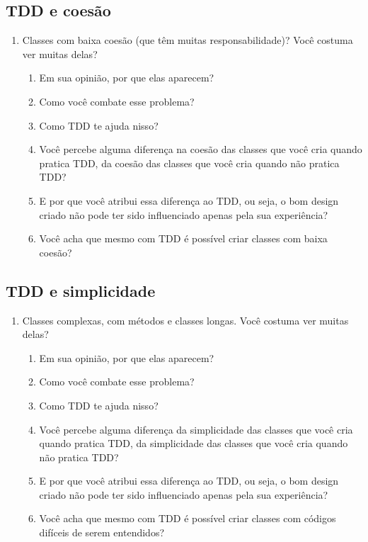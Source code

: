 \subsection{TDD e coesão}
\label{entrevista:coesao}

\begin{enumerate}
	\item{Classes com baixa coesão (que têm muitas responsabilidade)? Você
	costuma ver muitas delas?}
		\begin{enumerate}
			\item Em sua opinião, por que elas aparecem?

			\item Como você combate esse problema?

			\item Como TDD te ajuda nisso?
			
			\item Você percebe alguma diferença na coesão das classes que você cria quando
			pratica TDD, da coesão das classes que você cria quando não pratica TDD?
			
			\item E por que você atribui essa diferença ao TDD, ou seja, o bom design
			criado não pode ter sido influenciado apenas pela sua experiência?

			\item Você acha que mesmo com TDD é possível criar classes com baixa coesão? 

		\end{enumerate}
\end{enumerate}

\subsection{TDD e simplicidade}
\label{entrevista:simplicidade}


\begin{enumerate}
	\item{Classes complexas, com métodos e classes longas. Você
	costuma ver muitas delas?}
		\begin{enumerate}
			\item Em sua opinião, por que elas aparecem?

			\item Como você combate esse problema?

			\item Como TDD te ajuda nisso?
			
			\item Você percebe alguma diferença da simplicidade das classes que você cria quando
			pratica TDD, da simplicidade das classes que você cria quando não pratica TDD?
			
			\item E por que você atribui essa diferença ao TDD, ou seja, o bom design
			criado não pode ter sido influenciado apenas pela sua experiência?

			\item Você acha que mesmo com TDD é possível criar classes com códigos difíceis de serem entendidos? 

		\end{enumerate}
\end{enumerate}

